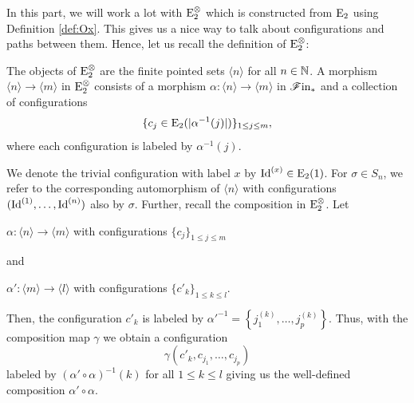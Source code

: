 In this part,
we will work a lot with $\operatorname{\operatorname{E}_2^{\otimes}}$ which is constructed from $\operatorname{E}_2$ using Definition \ref{def:Ox}. This gives us a nice way to talk about configurations and paths between
them. Hence, let us recall the definition of $\operatorname{\operatorname{E}_2^{\otimes}}$:
\begin{rem}\label{rem:ex}
    The objects of $\operatorname{\operatorname{E}_2^{\otimes}}$ are the finite pointed sets $\langle n \rangle$ for all
    $n \in \mathbb{N}$. A morphism $\langle n \rangle \to \langle m \rangle$ in $\operatorname{\operatorname{E}_2^{\otimes}}$
    consists of a morphism $\alpha \colon \langle n \rangle \to \langle m
    \rangle$ in $\mathscr{F} \text{in}_{\ast}$ and a collection of configurations
    $$\{c_j \in \operatorname{E}_2(|\alpha^{-1}(j)|)\}_{1 \leq j \leq m},$$ where each
    configuration is labeled by $\alpha^{-1}(j)$.

    We denote the trivial configuration with label $x$ by $\operatorname{Id}^{(x)} \in \operatorname{E}_2(1)$.
    For $\sigma \in S_n$, we refer to the corresponding automorphism of $\langle
    n \rangle$ with configurations $(\operatorname{Id}^{(1)}, \dots, \operatorname{Id}^{(n)})$ also by $\sigma$.
    Further, recall the composition in $\operatorname{\operatorname{E}_2^{\otimes}}$. Let 
    \begin{center}
        $\alpha \colon \langle n \rangle \to \langle m \rangle$ with
        configurations $\{c_j\}_{1 \leq j \leq m}$ 
    \end{center}
    and 
    \begin{center}
        $\alpha' \colon \langle m \rangle \to \langle l \rangle$ with
        configurations $\{c'_k\}_{1 \leq k \leq l}$. 
    \end{center}
    Then, the configuration $c'_k$ is labeled by $\alpha'^{-1}=\left\{j_1^{(k)},
    \dots, j_p^{(k)}\right\}$. Thus, with the composition map $\gamma$ we obtain a configuration 
    \[
        \gamma(c'_k, c_{j_1}, \dots, c_{j_p})
    \]
    labeled by $(\alpha' \circ \alpha)^{-1}(k)$ for all $1 \leq k \leq l$ giving
    us the well-defined composition $\alpha' \circ \alpha$.
\end{rem}


